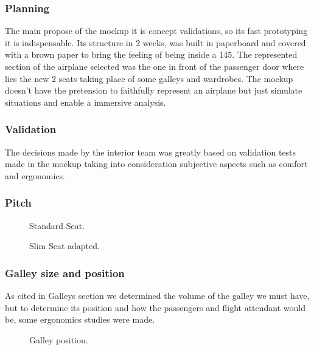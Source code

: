 ﻿\subsubsection{Planning}
The main propose of the mockup it is concept validations, so its fast prototyping it is indispensable.
Its structure in 2 weeks, was built in paperboard and covered with a brown paper to bring the feeling of being inside a 145.
The represented section of the airplane selected was the one in front of the passenger door where lies the new 2 seats taking place of some galleys and wardrobes.
The mockup doesn't have the pretension to faithfully represent an airplane but just simulate situations and enable a immersive analysis.

\subsubsection{Validation}
The decisions made by the interior team was greatly based on validation tests made in the mockup taking into consideration subjective aspects such as comfort and ergonomics.

\subsubsection{Pitch}

\begin{figure}[H] %
\caption{Standard Seat.}
\label{fig:standardseat}
\end{figure}

\begin{figure}[H] %
\caption{Slim Seat adapted.}
\label{fig:adaptedseat}
\end{figure}




\subsubsection{Galley size and position}
As cited in Galleys section we determined the volume of the galley we must have, but to determine its position and how the passengers and flight attendant would be, some ergonomics studies were made.


\begin{figure}[H] %
\caption{Galley position.}
\label{fig:galleypos_solo}
\end{figure}

